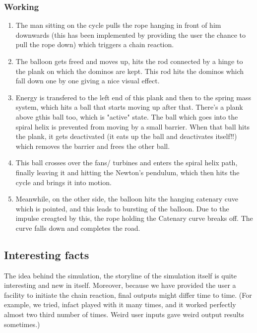 \documentclass[12pt, a4paper]{article}
\begin{document}
\subsubsection{Working}
\begin{enumerate}
\item {The man sitting on the cycle pulls the rope hanging in front of him
downwards (this has been implemented by providing the user the
chance to pull the rope down) which triggers a chain reaction.}

\item {The balloon gets freed and moves up, hits the rod connected by a
hinge to the plank on which the dominos are kept. This rod hits the
dominos which fall down one by one giving a nice visual effect.}

\item  {Energy is transfered to the left end of this plank and then to the spring mass
system, which hits a ball that starts moving up after that. There's a plank above gthis ball too, which is "active" state. The ball which goes into the spiral helix is prevented from moving by a small barrier. When that ball hits the plank, it gets deactivated (it eats up the ball and deactivates itself!!) which removes the barrier and frees the other ball. }

\item {This ball crosses over the fans/ turbines and enters the spiral helix path, finally leaving it and hitting the Newton’s pendulum, which then  hits the cycle and brings it into motion.}

\item {Meanwhile, on the other side, the balloon hits the hanging catenary cuve which is pointed, and this leads to bursting of the balloon. Due to the impulse creagted by this, the rope holding the Catenary curve breaks off. The curve falls down and completes the road.}
\end{enumerate}

\subsection{Interesting facts}
The idea behind the simulation, the storyline of the simulation itself is quite interesting and new in itself. Moreover, because we have provided the user a facility to initiate the chain reaction, final outputs might differ time to time. (For example, we tried, infact played with it many times, and it worked perfectly almost two third number of times. Weird user inputs gave weird output results sometimes.)
\end{document}
